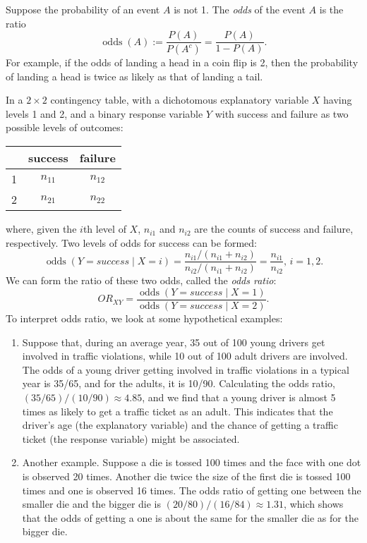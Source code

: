 \documentclass[12pt]{article}
\begin{document}

Suppose the probability of an event $A$ is not 1.  The \emph{odds} of the event $A$ is the ratio 
$$\operatorname{odds}(A):=\frac{P(A)}{P(A^c)}=\frac{P(A)}{1-P(A)}.$$ 
For example, if the odds of landing a head in a coin flip is 2, then the probability of landing a head is twice 
as likely as that of landing a tail. 
\par 
In a $2\times2$ contingency table, with a dichotomous explanatory variable $X$ having levels 1 and 2, and a binary response variable $Y$ with success and failure as two possible levels of outcomes: 
\begin{center} 
\begin{tabular}{|c|c|c|} 
\hline 
 & success & failure \\ 
\hline 
1 & $n_{11}$ & $n_{12}$ \\ 
\hline 
2 & $n_{21}$ & $n_{22}$ \\ 
\hline 
\end{tabular} 
\end{center} 
where, given the $i$th level of $X$, $n_{i1}$ and $n_{i2}$ are the counts of success and failure, respectively. 
Two levels of odds for success can be formed: 
$$\operatorname{odds}(Y=success \mid X=i)=\frac{n_{i1}/(n_{i1}+n_{i2})}{n_{i2}/(n_{i1}+n_{i2})}=\frac{n_{i1}}{n_{i2}}\mbox{, }i=1,2.$$ 
We can form the ratio of these two odds, called the \emph{odds ratio}: 
$$OR_{XY}=\frac{\operatorname{odds}(Y=success \mid X=1)}{\operatorname{odds}(Y=success \mid X=2)}.$$ 
To interpret odds ratio, we look at some hypothetical examples:  
\begin{enumerate}
\item  Suppose that, during an average year, 35 out of 100 young drivers get involved in traffic violations, while 10 out of 100 adult drivers are involved.  The odds of a young driver getting involved in traffic violations in a typical year is 35/65, and for the adults, it is 10/90.  Calculating the odds ratio, $(35/65)/(10/90)\approx4.85$, and we find that a young driver is almost 5 times as likely to get a traffic ticket as an adult.  This indicates that the driver's age (the explanatory variable) and the chance of getting a traffic ticket (the response variable) might be associated. 
\item  Another example.  Suppose a die is tossed 100 times and the face with one dot is observed 20 times.  Another die twice the size of the first die is tossed 100 times and one is observed 16 times.  The odds ratio of getting one between the smaller die and the bigger die is $(20/80)/(16/84)\approx1.31$,  which shows that the odds of getting a one is about the same for the smaller die as for the bigger die. 
\end{enumerate}
\end{document}
